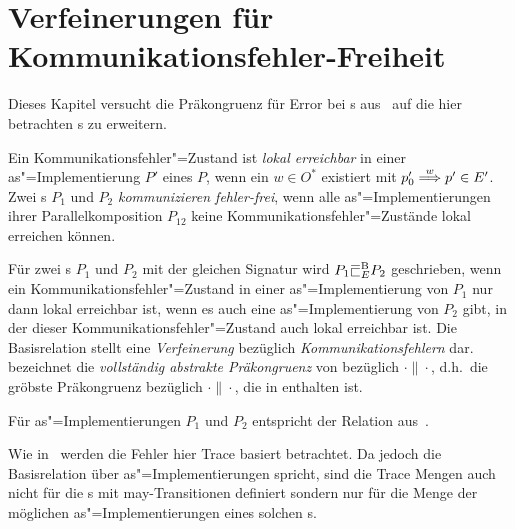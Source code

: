 \chapter{Verfeinerungen für Kommunikationsfehler-Freiheit}

Dieses Kapitel versucht die Präkongruenz für Error bei \EIO{}s
aus~\cite{Schinko2016BA} auf die hier betrachten \MEIO{}s zu erweitern.

\begin{Def}
  Ein Kommunikationsfehler"=Zustand ist \emph{lokal erreichbar} in einer
  as"=Implementierung $P'$ eines \MEIO{} $P$, wenn ein $w\in O^*$ existiert mit
  $p'_0 \weakmust[w]p'\in E'$.\\
  Zwei \MEIO{}s $P_1$ und $P_2$ \emph{kommunizieren fehler-frei}, wenn alle
  as"=Implementierungen ihrer Parallelkomposition $P_{12}$ keine
  Kommunikationsfehler"=Zustände lokal erreichen können.
\end{Def}

\begin{Def}
  Für zwei \MEIO{}s $P_1$ und $P_2$ mit der gleichen Signatur wird $P_1\EBRel{} P_2$
  geschrieben, wenn ein Kommunikationsfehler"=Zustand in einer as"=Implementierung
  von $P_1$ nur dann lokal erreichbar ist, wenn es auch eine as"=Implementierung
  von $P_2$ gibt, in der dieser Kommunikationsfehler"=Zustand auch lokal
  erreichbar ist. Die Basisrelation stellt eine \emph{Verfeinerung} bezüglich
  \emph{Kommunikationsfehlern} dar.\\
  \ECRel{} bezeichnet die \emph{vollständig abstrakte Präkongruenz} von
  \EBRel{} bezüglich $\cdot\|\cdot$, d.h.\ die gröbste Präkongruenz bezüglich
  $\cdot\|\cdot$, die in \EBRel{} enthalten ist.
\end{Def}

Für as"=Implementierungen $P_1$ und $P_2$ entspricht \EBRel{} der Relation
\EBbaRel{} aus~\cite{Schinko2016BA}.

Wie in~\cite{Schinko2016BA} werden die Fehler hier Trace basiert betrachtet. Da
jedoch die Basisrelation über as"=Implementierungen spricht, sind die Trace Mengen
auch nicht für die \MEIO{}s mit may-Transitionen definiert sondern nur für die
Menge der möglichen as"=Implementierungen eines solchen \MEIO{}s.


